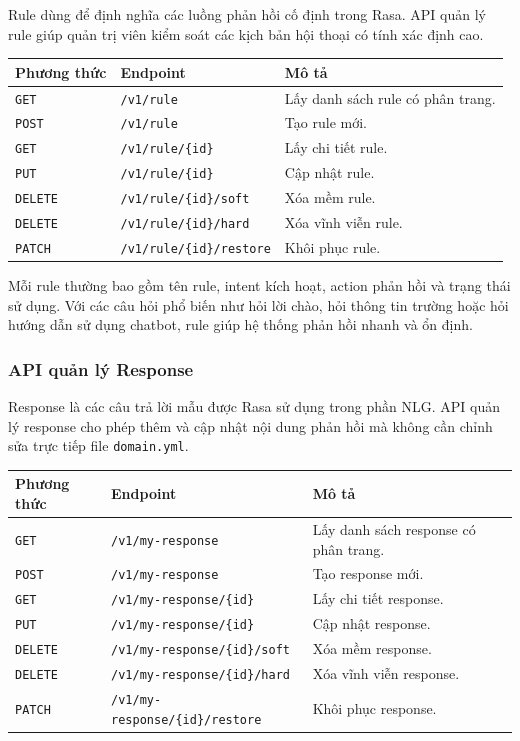 Rule dùng để định nghĩa các luồng phản hồi cố định trong Rasa. API quản lý rule giúp quản trị viên kiểm soát các kịch bản hội thoại có tính xác định cao.

\begin{longtable}{|p{3cm}|p{5cm}|p{7cm}|}
\hline
\textbf{Phương thức} & \textbf{Endpoint} & \textbf{Mô tả} \\
\hline
\texttt{GET} & \texttt{/v1/rule} & Lấy danh sách rule có phân trang. \\
\hline
\texttt{POST} & \texttt{/v1/rule} & Tạo rule mới. \\
\hline
\texttt{GET} & \texttt{/v1/rule/\{id\}} & Lấy chi tiết rule. \\
\hline
\texttt{PUT} & \texttt{/v1/rule/\{id\}} & Cập nhật rule. \\
\hline
\texttt{DELETE} & \texttt{/v1/rule/\{id\}/soft} & Xóa mềm rule. \\
\hline
\texttt{DELETE} & \texttt{/v1/rule/\{id\}/hard} & Xóa vĩnh viễn rule. \\
\hline
\texttt{PATCH} & \texttt{/v1/rule/\{id\}/restore} & Khôi phục rule. \\
\hline
\end{longtable}

Mỗi rule thường bao gồm tên rule, intent kích hoạt, action phản hồi và trạng thái sử dụng. Với các câu hỏi phổ biến như hỏi lời chào, hỏi thông tin trường hoặc hỏi hướng dẫn sử dụng chatbot, rule giúp hệ thống phản hồi nhanh và ổn định.

\subsubsection{API quản lý Response}

Response là các câu trả lời mẫu được Rasa sử dụng trong phần NLG. API quản lý response cho phép thêm và cập nhật nội dung phản hồi mà không cần chỉnh sửa trực tiếp file \texttt{domain.yml}.

\begin{longtable}{|p{3cm}|p{5cm}|p{7cm}|}
\hline
\textbf{Phương thức} & \textbf{Endpoint} & \textbf{Mô tả} \\
\hline
\texttt{GET} & \texttt{/v1/my-response} & Lấy danh sách response có phân trang. \\
\hline
\texttt{POST} & \texttt{/v1/my-response} & Tạo response mới. \\
\hline
\texttt{GET} & \texttt{/v1/my-response/\{id\}} & Lấy chi tiết response. \\
\hline
\texttt{PUT} & \texttt{/v1/my-response/\{id\}} & Cập nhật response. \\
\hline
\texttt{DELETE} & \texttt{/v1/my-response/\{id\}/soft} & Xóa mềm response. \\
\hline
\texttt{DELETE} & \texttt{/v1/my-response/\{id\}/hard} & Xóa vĩnh viễn response. \\
\hline
\texttt{PATCH} & \texttt{/v1/my-response/\{id\}/restore} & Khôi phục response. \\
\hline
\end{longtable}

